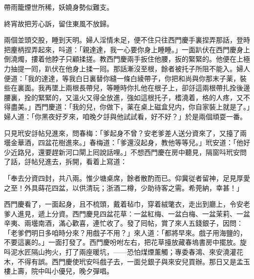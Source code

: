 帶雨籠煙世所稀，妖嬈身勢似難支。

終宵故把芳心訴，留住東風不放歸。

兩個並頭交股，睡到天明。婦人淫情未足，便不住只往西門慶手裏捏弄那話，登時把麈柄捏弄起來，呌道：「親達達，我一心要你身上睡睡。」一面趴伏在西門慶身上倒澆燭，摟着他脖子只顧揉搓。教西門慶兩手扳住他腰，扳的緊緊的。他便在上極力抽提一囘，趴伏在他身上揉一囘。那話漸沒至根，餘者被托子所阻不能入。婦人便道：「我的達達，等我白日裏替你縫一條白綾帶子，你把和尚與你那末子薬，裝些在裏面。我再墜上兩根長帶兒，等睡時你扎他在根子上，卻㧱這兩根帶扎拴後邊腰裏，拴的緊緊的，又溫火又得全放進，強如這根托子，榰澆着，格的人疼，又不得盡美。」西門慶道：「我的兒，你做下，薬在桌上磁盒兒内，你自家裝上就是了。」婦人道：「你黑夜好歹來，咱晚夕㧱與他試試看，好不好？」於是兩個頑耍一番。

只見玳安㧱帖兒進來，問春梅：「爹起身不曾？安老爹差人送分資來了，又擡了兩壜金華酒，四盆花樹進來。」春梅道：「爹還沒起身，教他等等兒。」玳安道：「他好少近路兒，還要趕新河口閘上囘說話哩。」不想西門慶在房中聽見，隔窗呌玳安問了話，㧱帖兒進去，拆開，看着上寫道：

「奉去分資四封，共八兩。惟少塘桌席，餘者散酌而已。仰冀従者留神，足見厚愛之至！外具蒔花四盆，以供清玩；浙酒二樽，少助待客之需。希莞納，幸甚！」

西門慶看了，一面起身，且不梳頭，戴着毡巾，穿着絨氅衣，走出到廳上，令安老爹人進見，遞上分資。西門慶見四盆花草：一盆紅梅、一盆白梅、一盆茉莉、一盆辛夷、兩壜南酒，滿心歡喜，連忙收了。發了囘帖，賞了來人五錢銀子，因問：「老爹們明日多咱時分來？用戲子不用？」來人道：「都將早來。戲子用海鹽的，不要這裏的。」一面打發了。西門慶吩咐左右，把花草擡放藏春塢書房中擺放。旋呌泥水匠隔山拘火，打了兩座暖坑，——恐怕煤煙薰觸；專委春鴻、來安澆灌花木，不得有誤。西門慶使玳安呌戲子去，一面兑銀子與來安兒買辦。那日又是孟玉樓上壽，院中叫小優兒，晚夕彈唱。

